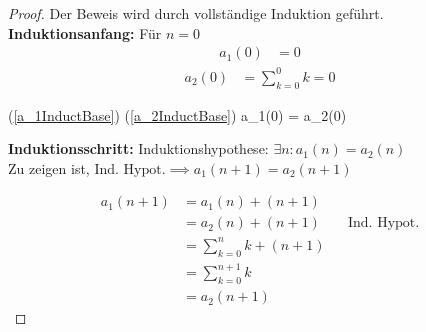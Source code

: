 \documentclass{article}
\newenvironment{aleq}{
\begin{equation}
\begin{aligned}
}{
\end{aligned}
\end{equation}
}
\newenvironment{aleq*}{\begin{equation*}\begin{aligned}}{\end{aligned}\end{equation*}}
\begin{document}
	\begin{proof} Der Beweis wird durch vollständige Induktion geführt. \\
	\textbf{Induktionsanfang:} Für \(n=0\)
	\begin{aleq}
		\label{a_1InductBase}
			a_1(0) &= 0 
	\end{aleq}
	\begin{aleq}
		\label{a_2InductBase}
			a_2(0) &= \sum_{k=0}^{0} k = 0
	\end{aleq}
	\begin{aleq*}
		(\ref{a_1InductBase}) \land (\ref{a_2InductBase}) \implies a_1(0) = a_2(0)
	\end{aleq*}
	
	
	\textbf{Induktionsschritt:} Induktionshypothese: \(\exists n \colon a_1(n) = a_2(n)\) \\
	Zu zeigen ist, \(\text{Ind. Hypot.} \implies a_1(n+1) = a_2(n+1)\)
	
	\begin{equation*}
		\begin{aligned}
			a_1(n+1) &= a_1(n) + (n+1) \\
			&= a_2(n) + (n+1) && \text{Ind. Hypot.} \\
			&= \sum_{k=0}^{n}k + (n+1) \\
			&= \sum_{k=0}^{n+1}k \\
			&= a_2(n+1)
		\end{aligned}
	\end{equation*}
	\end{proof}
	
\end{document}
